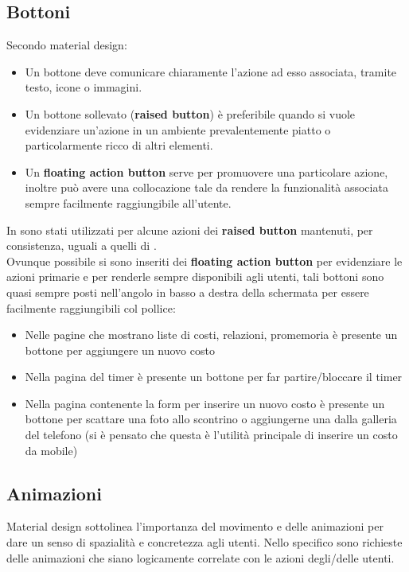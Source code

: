 \subsection{Bottoni}\label{bottoni}
Secondo material design:

\begin{itemize}
\item Un bottone deve comunicare chiaramente l'azione ad esso associata, tramite
testo, icone o immagini.
\item Un bottone sollevato (\textbf{raised button}) è preferibile quando si vuole
evidenziare un'azione in un ambiente prevalentemente piatto o particolarmente ricco
di altri elementi.
\item Un \textbf{floating action button} serve per promuovere una particolare azione,
inoltre può avere una collocazione tale da rendere la funzionalità associata sempre
facilmente raggiungibile all'utente.
\end{itemize}

In \fiscoloMobile{} sono stati utilizzati per alcune azioni dei \textbf{raised button}
mantenuti, per consistenza, uguali a quelli di \fiscoloWeb{}. \\

Ovunque possibile si sono inseriti dei \textbf{floating action button} per evidenziare
le azioni primarie e per renderle sempre disponibili agli utenti, tali bottoni sono
quasi sempre posti nell'angolo in basso a destra della schermata per essere facilmente
raggiungibili col pollice:

\begin{itemize}
\item Nelle pagine che mostrano liste di costi, relazioni, promemoria è presente un
bottone per aggiungere un nuovo costo
\item Nella pagina del timer è presente un bottone per far partire/bloccare il timer
\item Nella pagina contenente la form per inserire un nuovo costo è presente un bottone
per scattare una foto allo scontrino o aggiungerne una dalla galleria del telefono (si è
pensato che questa è l'utilità principale di inserire un costo da mobile)
\end{itemize}

\subsection{Animazioni}\label{material-animation}
Material design sottolinea l'importanza del movimento e delle animazioni per dare un
senso di spazialità e concretezza agli utenti. Nello specifico sono richieste delle
animazioni che siano logicamente correlate con le azioni degli/delle utenti.

